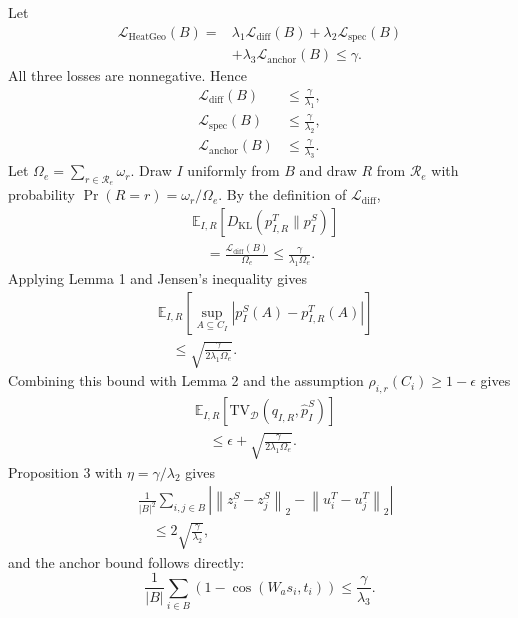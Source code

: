 Let
\begin{equation}
\begin{aligned}
    \mathcal{L}_{\mathrm{HeatGeo}}(B)
    ={}&
    \lambda_{1}\mathcal{L}_{\mathrm{diff}}(B)
    +
    \lambda_{2}\mathcal{L}_{\mathrm{spec}}(B)\\
    &+
    \lambda_{3}\mathcal{L}_{\mathrm{anchor}}(B)
    \le \gamma.
\end{aligned}
\end{equation}
All three losses are nonnegative. Hence
\begin{equation}
\begin{aligned}
    \mathcal{L}_{\mathrm{diff}}(B)
    &\le \frac{\gamma}{\lambda_{1}},\\
    \mathcal{L}_{\mathrm{spec}}(B)
    &\le \frac{\gamma}{\lambda_{2}},\\
    \mathcal{L}_{\mathrm{anchor}}(B)
    &\le \frac{\gamma}{\lambda_{3}}.
\end{aligned}
\end{equation}
Let $\Omega_e=\sum_{r\in\mathcal{R}_e}\omega_r$. Draw $I$ uniformly from $B$ and draw $R$ from $\mathcal{R}_e$ with probability $\Pr(R=r)=\omega_r/\Omega_e$. By the definition of $\mathcal{L}_{\mathrm{diff}}$,
\begin{equation}
\begin{aligned}
&\mathbb{E}_{I,R}\left[
D_{\mathrm{KL}}\left(p^T_{I,R}\|p_I^S\right)
\right]\\
&\quad=
\frac{\mathcal{L}_{\mathrm{diff}}(B)}{\Omega_e}
\le
\frac{\gamma}{\lambda_{1}\Omega_e}.
\end{aligned}
\end{equation}
Applying Lemma 1 and Jensen's inequality gives
\begin{equation}
\begin{aligned}
&\mathbb{E}_{I,R}\left[\sup_{A\subseteq C_I}
\left|p_I^S(A)-p^T_{I,R}(A)\right|\right]\\
&\quad\le
\sqrt{
\frac{\gamma}{2\lambda_{1}\Omega_e}
}.
\end{aligned}
\end{equation}
Combining this bound with Lemma 2 and the assumption $\rho_{i,r}(C_i)\ge 1-\epsilon$ gives
\begin{equation}
\begin{aligned}
&\mathbb{E}_{I,R}\left[
\mathrm{TV}_{\mathcal{D}}
\left(q_{I,R},\widehat p_I^S\right)
\right]\\
&\quad\le
\epsilon+
\sqrt{
\frac{\gamma}{2\lambda_{1}\Omega_e}
}.
\end{aligned}
\end{equation}
Proposition 3 with $\eta=\gamma/\lambda_{2}$ gives
\begin{equation}
\begin{aligned}
&\frac{1}{|B|^2}\sum_{i,j\in B}
\left|\left\|z_i^S-z_j^S\right\|_2
-\left\|u_i^T-u_j^T\right\|_2\right|\\
&\quad\le
2\sqrt{\frac{\gamma}{\lambda_{2}}},
\end{aligned}
\end{equation}
and the anchor bound follows directly:
\begin{equation}
    \frac{1}{|B|}\sum_{i\in B}
    \left(1-\cos(W_as_i,t_i)\right)
    \le
    \frac{\gamma}{\lambda_{3}}.
\end{equation}
